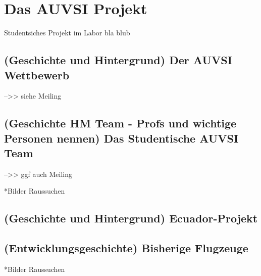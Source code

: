 \chapter{Das AUVSI Projekt}\label{cha:Das AUVSI Projekt}

Studentsiches Projekt im Labor  bla blub

\section{(Geschichte und Hintergrund) Der AUVSI Wettbewerb}

-->> siehe Meiling 

\section{(Geschichte HM Team - Profs und wichtige Personen nennen) Das Studentische AUVSI Team}

-->> ggf auch Meiling

*Bilder Raussuchen

\section{(Geschichte und Hintergrund) Ecuador-Projekt}

\section{(Entwicklungsgeschichte) Bisherige Flugzeuge}

*Bilder Raussuchen

\begin{comment}
\begin{figure}[H]
\centering
\texttt{[image: Flugzeug\_Bild]} 
\caption{Flugzeug Saison blub-foo} 
\label{fig:Pruefstand}
\end{figure}
\end{comment}

